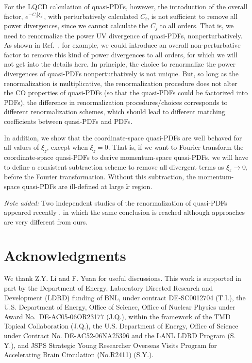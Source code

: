 \documentclass[twocolumn,aps,prd,superscriptaddress,nofootinbib,showpacs]{revtex4}
\begin{document}
For the LQCD calculation of quasi-PDFs, however, the introduction of the overall factor, $e^{-C_i |\xi_z|}$, with perturbatively calculated $C_i$, is not sufficient to remove all power divergences, since we cannot calculate the $C_j$ to all orders.  That is, we need to renormalize the power UV divergence of quasi-PDFs, nonperturbatively.  As shown in Ref.~\cite{Ishikawa:2016znu}, for example, we could introduce an overall non-perturbative factor to remove this kind of power divergences to all orders, for which we will not get into the details here.  In principle, the choice to renormalize the power divergences of quasi-PDFs nonperturbatively is not unique.  But, so long as the renormalization is multiplicative, the renormalization procedure does not alter the CO properties of quasi-PDFs (so that the quasi-PDFs could be factorized into PDFs), the difference in renormalization procedures/choices corresponds to different renormalization schemes, which should lead to different matching coefficients between quasi-PDFs and PDFs.

In addition, we show that the coordinate-space quasi-PDFs are well behaved for all values of $\xi_z$, except when $\xi_z=0$.  That is,
if we want to Fourier transform the coordinate-space quasi-PDFs to derive momentum-space quasi-PDFs, we will have to define a consistent subtraction scheme to remove all divergent terms as $\xi_z\to 0$, before the Fourier transformation.  Without this subtraction, the momentum-space quasi-PDFs are ill-defined at large $\tilde{x}$ region.

{\it Note added:} Two independent studies of the renormalization of quasi-PDFs appeared recently \cite{Ji:2017oey,Green:2017xeu}, in which the same conclusion is reached although  approaches are very different from ours.


\section*{Acknowledgments}

We thank Z.Y. Li and F. Yuan for useful discussions.  This work is supported in part by the Department of Energy, Laboratory Directed Research and Development (LDRD) funding of BNL, under contract DE-SC0012704 (T.I.), the U.S. Department of Energy, Office of Science, Office of Nuclear Physics under Award No.~DE-AC05-06OR23177 (J.Q.), within the framework of the TMD Topical Collaboration (J.Q.), the U.S. Department of Energy, Office of Science under Contract No. DE-AC52-06NA25396 and the LANL LDRD Program (S. Y.), and  JSPS Strategic Young Researcher Overseas Visits Program for Accelerating Brain Circulation (No.R2411) (S.Y.).



\end{document}
